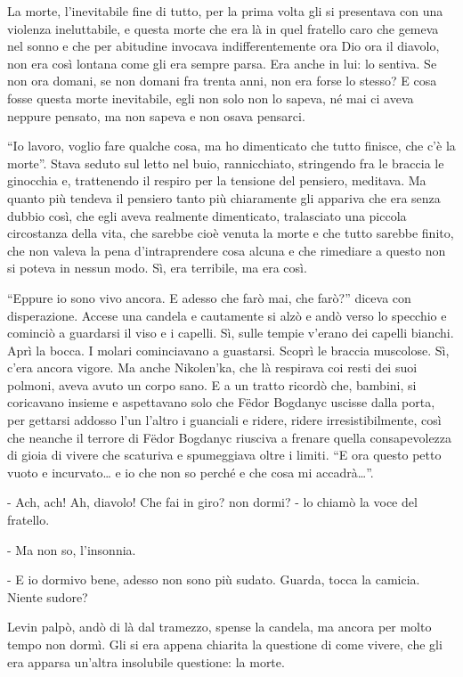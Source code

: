 La morte, l'inevitabile fine di tutto, per la prima volta gli si presentava con una violenza ineluttabile, e questa morte che era là in quel fratello caro che gemeva nel sonno e che per abitudine invocava indifferentemente ora Dio ora il diavolo, non era così lontana come gli era sempre parsa. Era anche in lui: lo sentiva. Se non ora domani, se non domani fra trenta anni, non era forse lo stesso? E cosa fosse questa morte inevitabile, egli non solo non lo sapeva, né mai ci aveva neppure pensato, ma non sapeva e non osava pensarci. 

``Io lavoro, voglio fare qualche cosa, ma ho dimenticato che tutto finisce, che c'è la morte''. Stava seduto sul letto nel buio, rannicchiato, stringendo fra le braccia le ginocchia e, trattenendo il respiro per la tensione del pensiero, meditava. Ma quanto più tendeva il pensiero tanto più chiaramente gli appariva che era senza dubbio così, che egli aveva realmente dimenticato, tralasciato una piccola circostanza della vita, che sarebbe cioè venuta la morte e che tutto sarebbe finito, che non valeva la pena d'intraprendere cosa alcuna e che rimediare a questo non si poteva in nessun modo. Sì, era terribile, ma era così. 

``Eppure io sono vivo ancora. E adesso che farò mai, che farò?'' diceva con disperazione. Accese una candela e cautamente si alzò e andò verso lo specchio e cominciò a guardarsi il viso e i capelli. Sì, sulle tempie v'erano dei capelli bianchi. Aprì la bocca. I molari cominciavano a guastarsi. Scoprì le braccia muscolose. Sì, c'era ancora vigore. Ma anche Nikolen'ka, che là respirava coi resti dei suoi polmoni, aveva avuto un corpo sano. E a un tratto ricordò che, bambini, si coricavano insieme e aspettavano solo che Fëdor Bogdanyc uscisse dalla porta, per gettarsi addosso l'un l'altro i guanciali e ridere, ridere irresistibilmente, così che neanche il terrore di Fëdor Bogdanyc riusciva a frenare quella consapevolezza di gioia di vivere che scaturiva e spumeggiava oltre i limiti. ``E ora questo petto vuoto e incurvato\ldots{} e io che non so perché e che cosa mi accadrà\ldots{}''. 

- Ach, ach! Ah, diavolo! Che fai in giro? non dormi? - lo chiamò la voce del fratello. 

- Ma non so, l'insonnia. 

- E io dormivo bene, adesso non sono più sudato. Guarda, tocca la camicia. Niente sudore? 

Levin palpò, andò di là dal tramezzo, spense la candela, ma ancora per molto tempo non dormì. Gli si era appena chiarita la questione di come vivere, che gli era apparsa un'altra insolubile questione: la morte. 

